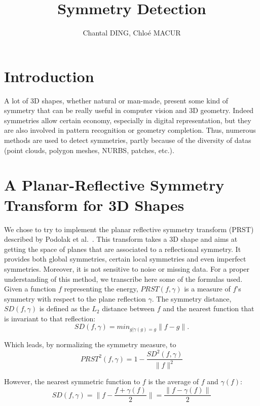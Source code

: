 \documentclass[10pt,a4paper]{article}                        %
\title{Symmetry Detection}
\author{Chantal DING, Chloé MACUR}
\begin{document}


\newpage
\tableofcontents

\newpage
        
        \section*{Introduction}
  
        A lot of 3D shapes, whether natural or man-made, present some kind of symmetry that can be really useful in computer vision and 3D geometry.  Indeed symmetries allow certain economy, especially in digital representation, but they are also involved in pattern recognition or geometry completion. Thus, numerous methods are used to detect symmetries, partly because of the diversity of datas (point clouds, polygon meshes, NURBS, patches, etc.).  
 
        \section{A Planar-Reflective Symmetry Transform for 3D Shapes}
        
        We chose to try to implement the planar reflective symmetry transform (PRST) described by Podolak et al.~\cite{Podolak:2006:APS}. This transform takes a 3D shape and aims at getting the space of planes that are associated to a reflectional symmetry. It provides both global symmetries, certain local symmetries and even imperfect symmetries. Moreover, it is not sensitive to noise or missing data. For a proper understanding of this method, we transcribe here some of the formulas used.\\
        
        Given a function $f$ representing the energy, $PRST(f,\gamma)$ is a measure of $f$'s symmetry with respect to the plane reflection $\gamma$.
        The symmetry distance, $SD(f,\gamma)$ is defined as the $L_2$ distance between $f$ and the nearest function that is invariant to that reflection:
        \begin{displaymath}
        SD(f,\gamma) = min_{g|\gamma(g)=g} \lVert f-g \lVert . %
        \end{displaymath}

Which leads, by normalizing the symmetry measure, to
$$ PRST^2(f,\gamma) = 1 - \frac{SD^2(f,\gamma)}{\lVert f \lVert ^2}         $$

However, the nearest symmetric function to $f$ is the average of $f$ and $\gamma(f)$:
$$ SD(f,\gamma) = \lVert f - \frac{f + \gamma(f)}{2} \lVert = \frac{\lVert f - \gamma(f) \lVert }{2} $$
\end{document}
